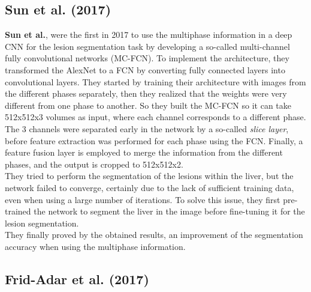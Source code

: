 \subsection*{Sun et al. (2017)}\label{sun-et-al.-2017}

\textbf{Sun et al.}, were the first in 2017 to use the multiphase
information in a deep CNN for the lesion segmentation task by developing
a so-called multi-channel fully convolutional networks (MC-FCN). To
implement the architecture, they transformed the AlexNet to a FCN by
converting fully connected layers into convolutional layers. They
started by training their architecture with images from the different
phases separately, then they realized that the weights were very
different from one phase to another. So they built the MC-FCN so it can
take 512x512x3 volumes as input, where each channel corresponds to a
different phase. The 3 channels were separated early in the network by a
so-called \emph{slice layer}, before feature extraction was performed
for each phase using the FCN. Finally, a feature fusion layer is
employed to merge the information from the different phases, and the
output is cropped to 512x512x2. \\
They tried to perform the segmentation of the lesions within the liver,
but the network failed to converge, certainly due to the lack of
sufficient training data, even when using a large number of iterations.
To solve this issue, they first pre-trained the network to segment the
liver in the image before fine-tuning it for the lesion segmentation. \\
They finally proved by the obtained results, an improvement of the
segmentation accuracy when using the multiphase information.

\subsection*{Frid-Adar et al. (2017)}\label{frid-adar-et-al.-2017}

